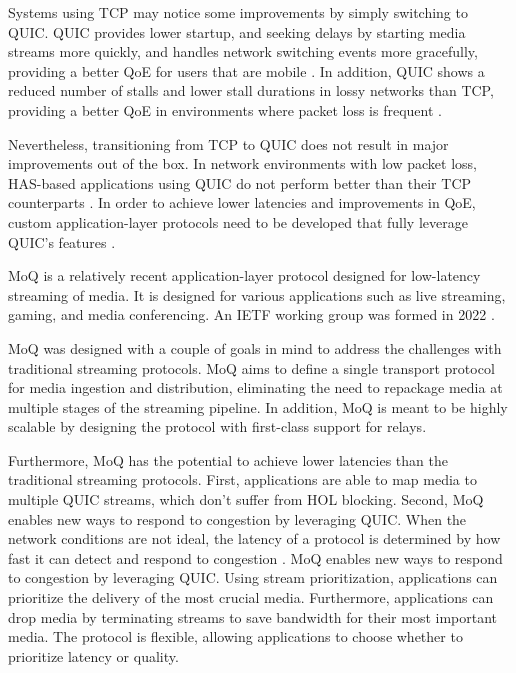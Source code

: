 Systems using TCP may notice some improvements by simply switching to QUIC. QUIC provides lower startup, and seeking delays by starting media streams more quickly, and handles network switching events more gracefully, providing a better \ac{QoE} for users that are mobile \parencite{arisuQuicklyStartingMedia2018}. In addition, QUIC shows a reduced number of stalls and lower stall durations in lossy networks than TCP, providing a better \ac{QoE} in environments where packet loss is frequent \parencite{shreedharEvaluatingQUICPerformance2022}.

Nevertheless, transitioning from TCP to QUIC does not result in major improvements out of the box. In network environments with low packet loss, \ac{HAS}-based applications using QUIC do not perform better than their TCP counterparts \parencite{timmererAdvancedTransportOptions2016}. In order to achieve lower latencies and improvements in \ac{QoE}, custom application-layer protocols need to be developed that fully leverage QUIC's features \parencite{nguyenTakeRedPill2022}.

\ac{MoQ} is a relatively recent application-layer protocol designed for low-latency streaming of media. It is designed for various applications such as live streaming, gaming, and media conferencing. An \ac{IETF} working group was formed in 2022 \parencite{MediaQUICMoq}. 

\ac{MoQ} was designed with a couple of goals in mind to address the challenges with traditional streaming protocols. \ac{MoQ} aims to define a single transport protocol for media ingestion and distribution, eliminating the need to repackage media at multiple stages of the streaming pipeline. In addition, \ac{MoQ} is meant to be highly scalable by designing the protocol with first-class support for relays. 

Furthermore, \ac{MoQ} has the potential to achieve lower latencies than the traditional streaming protocols. First, applications are able to map media to multiple QUIC streams, which don't suffer from \ac{HOL} blocking. Second, \ac{MoQ} enables new ways to respond to congestion by leveraging QUIC. When the network conditions are not ideal, the latency of a protocol is determined by how fast it can detect and respond to congestion \parencite{curleyMediaQUICTransport2024}. \ac{MoQ} enables new ways to respond to congestion by leveraging QUIC. Using stream prioritization, applications can prioritize the delivery of the most crucial media. Furthermore, applications can drop media by terminating streams to save bandwidth for their most important media. The protocol is flexible, allowing applications to choose whether to prioritize latency or quality.

